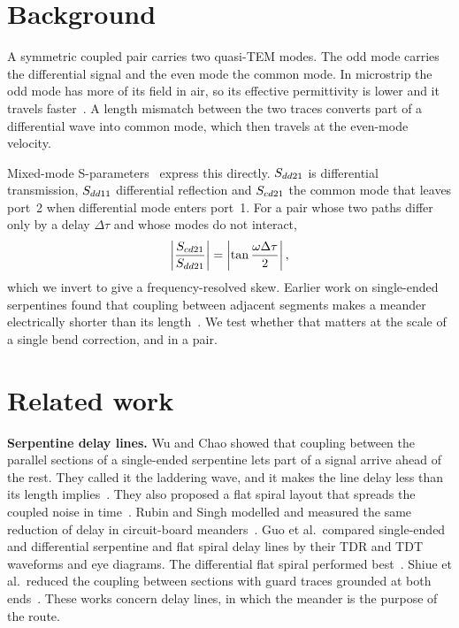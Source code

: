 \section{Background}

A symmetric coupled pair carries two quasi-TEM modes. The odd mode carries the differential signal and the even mode
the common mode. In microstrip the odd mode has more of its field in air, so its effective permittivity is
lower and it travels faster~\cite{paul_mtl}. A length mismatch between the two traces converts part of a
differential wave into common mode, which then travels at the even-mode velocity.

Mixed-mode S-parameters~\cite{bockelman1995,ferrero2006} express this directly. $S_{dd21}$ is differential
transmission, $S_{dd11}$ differential reflection and $S_{cd21}$ the common mode that leaves port~2 when
differential mode enters port~1. For a pair whose two paths differ only by a delay $\Delta\tau$ and whose modes do
not interact,
\begin{equation}
  \left|\frac{S_{cd21}}{S_{dd21}}\right| = \left|\tan\frac{\omega\Delta\tau}{2}\right|,
  \label{eq:fdskew}
\end{equation}
which we invert to give a frequency-resolved skew. Earlier work on single-ended serpentines found that coupling
between adjacent segments makes a meander electrically shorter than its length~\cite{wu1995,rubin2000}. We test
whether that matters at the scale of a single bend correction, and in a pair.

\section{Related work}
\label{sec:related}

\textbf{Serpentine delay lines.} Wu and Chao showed that coupling between the parallel sections of a single-ended serpentine lets part of a signal
arrive ahead of the rest. They called it the laddering wave, and it makes the line delay less than its length
implies~\cite{wu1995}. They also proposed a flat spiral layout that spreads the coupled noise in time~\cite{wu1996}. Rubin and Singh modelled and measured the same reduction of delay in circuit-board
meanders~\cite{rubin2000}. Guo et al.\ compared single-ended and differential serpentine and flat spiral delay lines by their TDR and TDT
waveforms and eye diagrams. The differential flat spiral performed best~\cite{guo2006}. Shiue et al.\ reduced the coupling between sections with guard traces grounded at both
ends~\cite{shiue2010}. These works concern delay lines, in which the meander is the purpose of the route.

